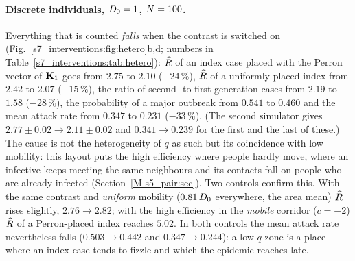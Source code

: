 \paragraph{Discrete individuals, $D_0=1$, $N=100$.} Everything that is counted \emph{falls} when the contrast
is switched on (Fig.~\ref{s7_interventions:fig:hetero}b,d; numbers in Table~\ref{s7_interventions:tab:hetero}): $\widehat{R}$ of
an index case placed with the Perron vector of $\mathbf{K}_1$ goes from $2.75$ to $2.10$ ($-24\,\%$), $\widehat{R}$ of a
uniformly placed index from $2.42$ to $2.07$ ($-15\,\%$), the ratio of second- to first-generation cases
from $2.19$ to $1.58$ ($-28\,\%$), the probability of a major outbreak from $0.541$ to $0.460$ and the mean
attack rate from $0.347$ to $0.231$ ($-33\,\%$).
(The second simulator gives $2.77\pm0.02\to2.11\pm0.02$ and $0.341\to0.239$ for the first
and the last of these.)
The cause is not the heterogeneity of $q$ as such but its coincidence with low mobility: this layout puts
the high efficiency where people hardly move, where an infective keeps meeting the same neighbours and its
contacts fall on people who are already infected (Section~\ref{M-s5_pair:sec}). Two controls confirm this. With
the same contrast and \emph{uniform} mobility ($0.81\,D_0$ everywhere, the area mean) $\widehat{R}$ rises slightly,
$2.76\to2.82$; with the high efficiency in the \emph{mobile} corridor ($c=-2$) $\widehat{R}$ of a Perron-placed
index reaches $5.02$.
In both controls the mean attack rate nevertheless falls ($0.503\to0.442$ and $0.347\to0.244$): a low-$q$
zone is a place where an index case tends to fizzle and which the epidemic reaches late.

